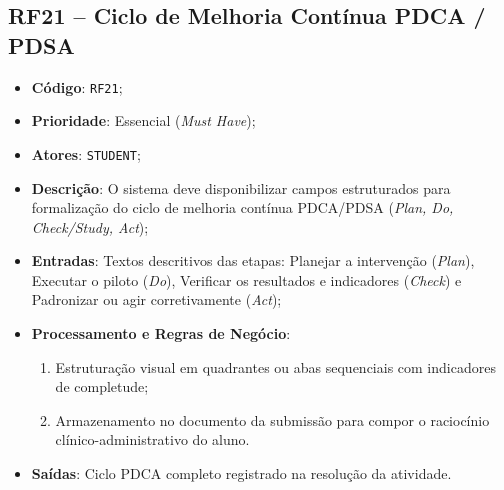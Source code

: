 \subsection{RF21 -- Ciclo de Melhoria Contínua PDCA / PDSA}
\begin{itemize}
    \item \textbf{Código}: \texttt{RF21};
    \item \textbf{Prioridade}: Essencial (\textit{Must Have});
    \item \textbf{Atores}: \texttt{STUDENT};
    \item \textbf{Descrição}: O sistema deve disponibilizar campos estruturados para formalização do ciclo de melhoria contínua PDCA/PDSA (\textit{Plan, Do, Check/Study, Act});
    \item \textbf{Entradas}: Textos descritivos das etapas: Planejar a intervenção (\textit{Plan}), Executar o piloto (\textit{Do}), Verificar os resultados e indicadores (\textit{Check}) e Padronizar ou agir corretivamente (\textit{Act});
    \item \textbf{Processamento e Regras de Negócio}:
    \begin{enumerate}
        \item Estruturação visual em quadrantes ou abas sequenciais com indicadores de completude;
        \item Armazenamento no documento da submissão para compor o raciocínio clínico-administrativo do aluno.
    \end{enumerate}
    \item \textbf{Saídas}: Ciclo PDCA completo registrado na resolução da atividade.
\end{itemize}

